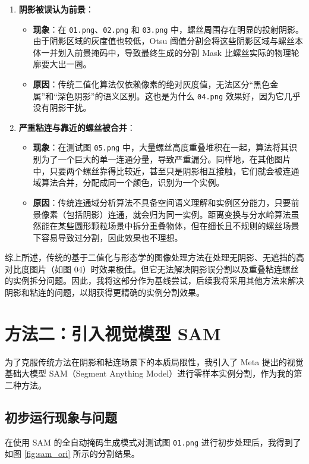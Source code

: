 \documentclass[12pt,a4paper]{ctexart}
\begin{document}
\begin{enumerate}
    \item \textbf{阴影被误认为前景}：
    \begin{itemize}
        \item \textbf{现象}：在 \texttt{01.png}、\texttt{02.png} 和 \texttt{03.png} 中，螺丝周围存在明显的投射阴影。由于阴影区域的灰度值也较低，Otsu 阈值分割会将这些阴影区域与螺丝本体一并划入前景掩码中，导致最终生成的分割 Mask 比螺丝实际的物理轮廓要大出一圈。
        \item \textbf{原因}：传统二值化算法仅依赖像素的绝对灰度值，无法区分“黑色金属”和“深色阴影”的语义区别。这也是为什么 \texttt{04.png} 效果好，因为它几乎没有阴影干扰。
    \end{itemize}
    \item \textbf{严重粘连与靠近的螺丝被合并}：
    \begin{itemize}
        \item \textbf{现象}：在测试图 \texttt{05.png} 中，大量螺丝高度重叠堆积在一起，算法将其识别为了一个巨大的单一连通分量，导致严重漏分。同样地，在其他图片中，只要两个螺丝靠得比较近，甚至只是阴影相互接触，它们就会被连通域算法合并，分配成同一个颜色，识别为一个实例。
        \item \textbf{原因}：传统连通域分析算法不具备空间语义理解和实例区分能力，只要前景像素（包括阴影）连通，就会归为同一实例。距离变换与分水岭算法虽然能在某些圆形颗粒场景中拆分重叠物体，但在细长且不规则的螺丝场景下容易导致过分割，因此效果也不理想。
    \end{itemize}
\end{enumerate}

综上所述，传统的基于二值化与形态学的图像处理方法在处理无阴影、无遮挡的高对比度图片（如图 04）时效果极佳。但它无法解决阴影误分割以及重叠粘连螺丝的实例拆分问题。因此，我将这部分作为基线尝试，后续我将采用其他方法来解决阴影和粘连的问题，以期获得更精确的实例分割效果。

\section{方法二：引入视觉模型 SAM }
为了克服传统方法在阴影和粘连场景下的本质局限性，我引入了 Meta 提出的视觉基础大模型 SAM（Segment Anything Model）进行零样本实例分割，作为我的第二种方法。

\subsection{初步运行现象与问题}
在使用 SAM 的全自动掩码生成模式对测试图 \texttt{01.png} 进行初步处理后，我得到了如图 \ref{fig:sam_ori} 所示的分割结果。
\end{document}
